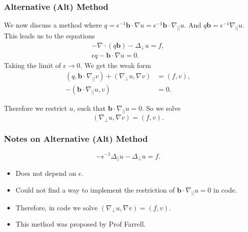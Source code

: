 \documentclass{beamer}
\begin{document}
    \begin{frame}
        \frametitle{Alternative (Alt) Method}
We now discuss a method where $q=\epsilon^{-1} \mathbf{b} \cdot \nabla u=\epsilon^{-1} \mathbf{b} \cdot \nabla_{||} u$. And $q\mathbf{b}= \epsilon^{-1}\nabla_{||}u$. This leads us to the equations
\begin{align*}
-\nabla \cdot (q \mathbf{b}) - \Delta_{\perp}u = f, \\
\epsilon q - \mathbf{b} \cdot \nabla u = 0.
\end{align*}
Taking the limit of $\epsilon \rightarrow 0$. We get the weak form
\begin{align*}
(q,\mathbf{b}\cdot \nabla_{||}v)+(\nabla_{\perp}u,\nabla v) &= (f, v),\\
- (\mathbf{b} \cdot\nabla_{||}u, v) &= 0.
\end{align*}

Therefore we restrict $u$, such that $\mathbf{b}\cdot \nabla_{||}u = 0$. So we solve
\begin{equation*}
(\nabla_{\perp}u, \nabla v) = (f, v).
\end{equation*}
    \end{frame}
    \begin{frame}
        \frametitle{Notes on Alternative (Alt) Method}

    \begin{equation*}
    -\epsilon^{-1}\Delta_{||}u-\Delta_{\bot}u = f.
    \end{equation*}

\begin{itemize}
\item Does not depend on $\epsilon$.
\item Could not find a way to implement the restriction of $\mathbf{b} \cdot \nabla_{||} u = 0$ in code. 
\item Therefore, in code we solve $(\nabla_{\perp}u,\nabla v)=(f,v)$.
\item This method was proposed by Prof Farrell.
\end{itemize}
    \end{frame}
    
\end{document}
